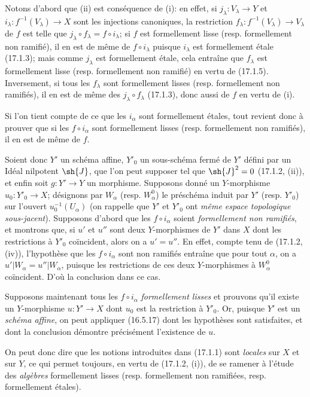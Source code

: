 Notons d'abord que (ii) est conséquence de (i): en effet, si $j_\lambda:V_\lambda\to Y$ et $i_\lambda:f^{-1}(V_\lambda)\to X$ sont les injections canoniques, la restriction $f_\lambda:f^{-1}(V_\lambda)\to V_\lambda$ de $f$ est telle que $j_\lambda\circ f_\lambda=f\circ i_\lambda$; si $f$ est formellement lisse (resp. formellement non ramifié), il en est de même de $f\circ i_\lambda$ puisque $i_\lambda$ est formellement étale (17.1.3); mais comme $j_\lambda$ est formellement étale, cela entraîne que $f_\lambda$ est formellement lisse (resp. formellement non ramifié) en vertu de (17.1.5). Inversement, si tous les $f_\lambda$ sont formellement lisses (resp. formellement non ramifiés), il en est de même des $j_\lambda\circ f_\lambda$ (17.1.3), donc aussi de $f$ en vertu de (i).

Si l'on tient compte de ce que les $i_\alpha$ sont formellement étales, tout revient donc à prouver que si les $f\circ i_\alpha$ sont formellement lisses (resp. formellement non ramifiés), il en est de même de $f$.

Soient donc $Y'$ un schéma affine, $Y'_0$ un sous-schéma fermé de $Y'$ défini par un Idéal nilpotent $\sh{J}$, que l'on peut supposer tel que $\sh{J}^2=0$ (17.1.2, (ii)), et enfin soit $g:Y'\to Y$ un morphisme. Supposons donné un $Y$-morphisme $u_0:Y'_0\to X$; désignons par $W_\alpha$ (resp. $W^0_\alpha$) le préschéma induit par $Y'$ (resp. $Y'_0$) sur l'ouvert $u_0^{-1}(U_\alpha)$ (on rappelle que $Y'$ et $Y'_0$ ont \emph{même espace topologique sous-jacent}). Supposons d'abord que les $f\circ i_\alpha$ soient \emph{formellement non ramifiés}, et montrons que, si $u'$ et $u''$ sont deux $Y$-morphismes de $Y'$ dans $X$ dont les restrictions à $Y'_0$ coïncident, alors on a $u'=u''$. En effet, compte tenu de (17.1.2, (iv)), l'hypothèse que les $f\circ i_\alpha$ sont non ramifiés entraîne que pour tout $\alpha$, on a $u'|W_\alpha=u''|W_\alpha$, puisque les restrictions de ces deux $Y$-morphismes à $W^0_\alpha$ coïncident. D'où la conclusion dans ce cas.

Supposons maintenant tous les $f\circ i_\alpha$ \emph{formellement lisses} et prouvons qu'il existe un $Y$-morphisme $u:Y'\to X$ dont $u_0$ est la restriction à $Y'_0$. Or, puisque $Y'$ est un \emph{schéma affine}, on peut appliquer (16.5.17) dont les hypothèses sont satisfaites, et dont la conclusion démontre précisément l'existence de $u$.

On peut donc dire que les notions introduites dans (17.1.1) sont \emph{locales} sur $X$ et sur $Y$, ce qui permet toujours, en vertu de (17.1.2, (i)), de se ramener à l'étude des \emph{algèbres} formellement lisses (resp. formellement non ramifiées, resp. formellement étales).

